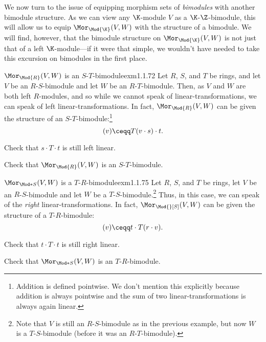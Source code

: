 We now turn to the issue of equipping morphism sets of \emph{bimodules} with another bimodule structure.  As we can view any $\K$-module $V$ as a $\K$-$\Z$-bimodule, this will allow us to equip $\Mor _{\Mod{\K}}(V,W)$ with the structure of a bimodule.  We will find, however, that the bimodule structure on $\Mor _{\Mod{\K}}(V,W)$ is not just that of a left $\K$-module---if it were that simple, we wouldn't have needed to take this excursion on bimodules in the first place.
\begin{exm}{$\Mor _{\Mod{R}}(V,W)$ is an $S$-$T$-bimodule}{exm1.1.72}
	Let $R$, $S$, and $T$ be rings, and let $V$ be an $R$-$S$-bimodule and let $W$ be an $R$-$T$-bimodule.  Then, as $V$ and $W$ are both left $R$-modules, and so while we cannot speak of linear-transformations, we can speak of left linear-transformations.  In fact, $\Mor _{\Mod{R}}(V,W)$ can be given the structure of an $S$-$T$-bimodule:\footnote{Addition is defined pointwise.  We don't mention this explicitly because addition is always pointwise and the sum of two linear-transformations is always again linear.}
	\begin{equation}
	[s\cdot T\cdot t](v)\ceqq T(v\cdot s)\cdot t.
	\end{equation}
	\begin{exr}[breakable=false]{}{}
		Check that $s\cdot T\cdot t$ is still left linear.
	\end{exr}
	\begin{exr}[breakable=false]{}{}
		Check that $\Mor _{\Mod{R}}(V,W)$ is an $S$-$T$-bimodule.
	\end{exr}
\end{exm}
\begin{exm}{$\Mor _{\Mod*{S}}(V,W)$ is a $T$-$R$-bimodule}{exm1.1.75}
	Let $R$, $S$, and $T$ be rings, let $V$ be an $R$-$S$-bimodule and let $W$ be a $T$-$S$-bimodule.\footnote{Note that $V$ is still an $R$-$S$-bimodule as in the previous example, but now $W$ is a $T$-$S$-bimodule (before it was an $R$-$T$-bimodule).}  Thus, in this case, we can speak of the \emph{right} linear-transformations.  In fact, $\Mor _{\Mod{}[S]}(V,W)$ can be given the structure of a $T$-$R$-bimodule:
	\begin{equation}
	[t\cdot T\cdot r](v)\ceqq t\cdot T(r\cdot v).
	\end{equation}
	\begin{exr}[breakable=false]{}{}
		Check that $t\cdot T\cdot t$ is still right linear.
	\end{exr}
	\begin{exr}[breakable=false]{}{}
		Check that $\Mor _{\Mod*{S}}(V,W)$ is an $T$-$R$-bimodule.
	\end{exr}
\end{exm}
